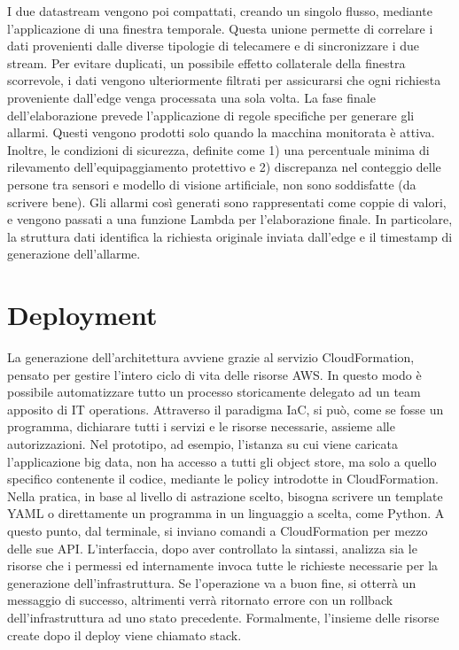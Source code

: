 I due datastream vengono poi compattati, creando un singolo flusso, mediante l'applicazione di una finestra temporale. Questa unione permette di correlare i dati provenienti dalle diverse tipologie di telecamere e di sincronizzare i due stream. Per evitare duplicati, un possibile effetto collaterale della finestra scorrevole, i dati vengono ulteriormente filtrati per assicurarsi che ogni richiesta proveniente dall'edge venga processata una sola volta. La fase finale dell'elaborazione prevede l'applicazione di regole specifiche per generare gli allarmi. Questi vengono prodotti solo quando la macchina monitorata è attiva. Inoltre, le condizioni di sicurezza, definite come 1) una percentuale minima di rilevamento dell'equipaggiamento protettivo e 2) discrepanza nel conteggio delle persone tra sensori e modello di visione artificiale, non sono soddisfatte (da scrivere bene). Gli allarmi così generati sono rappresentati come coppie di valori, e vengono passati a una funzione Lambda per l'elaborazione finale. In particolare, la struttura dati identifica la richiesta originale inviata dall'edge e il timestamp di generazione dell'allarme.



\section{Deployment}

La generazione dell'architettura avviene grazie al servizio CloudFormation, pensato per gestire l'intero ciclo di vita delle risorse AWS. In questo modo è possibile automatizzare tutto un processo storicamente delegato ad un team apposito di IT operations. Attraverso il paradigma IaC, si può, come se fosse un programma, dichiarare tutti i servizi e le risorse necessarie, assieme alle autorizzazioni. Nel prototipo, ad esempio, l'istanza su cui viene caricata l'applicazione big data, non ha accesso a tutti gli object store, ma solo a quello specifico contenente il codice, mediante le policy introdotte in CloudFormation. Nella pratica, in base al livello di astrazione scelto, bisogna scrivere un template YAML o direttamente un programma in un linguaggio a scelta, come Python. A questo punto, dal terminale, si inviano comandi a CloudFormation per mezzo delle sue API. L'interfaccia, dopo aver controllato la sintassi, analizza sia le risorse che i permessi ed internamente invoca tutte le richieste necessarie per la generazione dell'infrastruttura. Se l'operazione va a buon fine, si otterrà un messaggio di successo, altrimenti verrà ritornato errore con un rollback dell'infrastruttura ad uno stato precedente. Formalmente, l'insieme delle risorse create dopo il deploy viene chiamato stack. 

